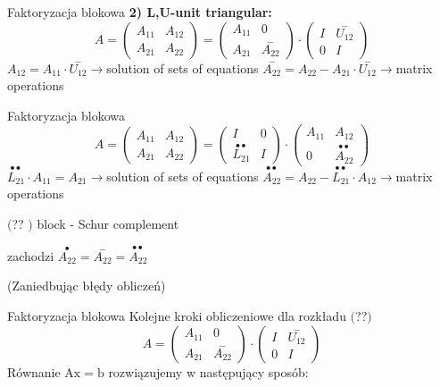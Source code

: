 \begin{frame}{Faktoryzacja blokowa}
\textbf{2) L,U-unit triangular:}
$$
A=\left(\begin{array}{ll}
A_{11} & A_{12}\\
A_{21} & A_{22}
\end{array}\right)=\left(\begin{array}{ll}
A_{11} & 0\\
A_{21} & \overset{-}{A_{22}}
\end{array}\right)\cdot \left(\begin{array}{ll}
I & \overset{-}{U_{12}}\\
0 & I
\end{array}\right)
$$
$ A_{12}=A_{11}\cdot \overset{-}{U_{12}}\rightarrow$solution of sets of equations $ \overset{-}{A_{22}}=A_{22}-A_{21}\cdot \overset{-}{U_{12}}\rightarrow$matrix operations

\end{frame}
\begin{frame}{Faktoryzacja blokowa}
$$
A=\left(\begin{array}{ll}
A_{11} & A_{12}\\
A_{21} & A_{22}
\end{array}\right)=\left(\begin{array}{ll}
I & 0\\
\overset{\bullet \bullet}{L_{21}} & I
\end{array}\right)\cdot \left(\begin{array}{ll}
A_{11} & A_{12}\\
 0 & \overset{\bullet \bullet}{A_{22}}
\end{array}\right)
$$
$ \overset{\bullet \bullet}{L_{21}}\cdot A_{11}=A_{21}\rightarrow$solution of sets of equations $ \overset{\bullet \bullet}{A_{22}}=A_{22}-\overset{\bullet \bullet}{L_{21}}\cdot A_{12}\rightarrow$matrix operations

$($?? $)$ block - Schur complement

zachodzi $\overset{\bullet}{A_{22}}=\overset{-}{A_{22}}=\overset{\bullet \bullet}{A_{22}}$

(Zaniedbując błędy obliczeń)
\end{frame}
\begin{frame}{Faktoryzacja blokowa}
Kolejne kroki obliczeniowe dla rozkładu $($??$)$
$$
A=\left(\begin{array}{ll}
A_{11} & 0\\
A_{21} & \overset{-}{A_{22}}
\end{array}\right)\cdot \left(\begin{array}{ll}
I & \overset{-}{U_{12}}\\
0 & I
\end{array}\right)
$$
Równanie $\mathrm{A}\mathrm{x}=\mathrm{b}$ rozwiązujemy w następujący sposób: 



\end{frame}
